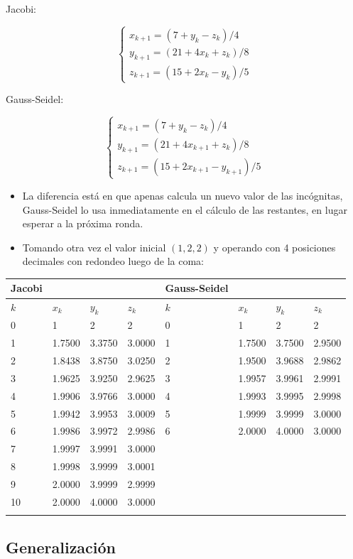 \documentclass[openany]{book}
\begin{document}
Jacobi:

\[
\begin{cases} 
x_{k+1}=(7+y_k-z_k)/4 \\
y_{k+1}=(21+4x_k+z_k)/8 \\
z_{k+1}=(15+2x_k-y_k)/5
\end{cases}
\]

Gauss-Seidel:

\[
\begin{cases} 
x_{k+1}=(7+y_k-z_k)/4 \\
y_{k+1}=(21+4x_{k+1}+z_k)/8 \\
z_{k+1}=(15+2x_{k+1}-y_{k+1})/5
\end{cases}
\]

\begin{itemize}
\item
  La diferencia está en que apenas calcula un nuevo valor de las incógnitas, Gauss-Seidel lo usa inmediatamente en el cálculo de las restantes, en lugar esperar a la próxima ronda.
\item
  Tomando otra vez el valor inicial \((1, 2, 2)\) y operando con 4 posiciones decimales con redondeo luego de la coma:
\end{itemize}

\begin{longtable}[]{@{}llllllll@{}}
\toprule
\textbf{Jacobi} & & & & \textbf{Gauss-Seidel} & & &\tabularnewline
\midrule
\endhead
\(k\) & \(x_k\) & \(y_k\) & \(z_k\) & \(k\) & \(x_k\) & \(y_k\) & \(z_k\)\tabularnewline
0 & 1 & 2 & 2 & 0 & 1 & 2 & 2\tabularnewline
1 & 1.7500 & 3.3750 & 3.0000 & 1 & 1.7500 & 3.7500 & 2.9500\tabularnewline
2 & 1.8438 & 3.8750 & 3.0250 & 2 & 1.9500 & 3.9688 & 2.9862\tabularnewline
3 & 1.9625 & 3.9250 & 2.9625 & 3 & 1.9957 & 3.9961 & 2.9991\tabularnewline
4 & 1.9906 & 3.9766 & 3.0000 & 4 & 1.9993 & 3.9995 & 2.9998\tabularnewline
5 & 1.9942 & 3.9953 & 3.0009 & 5 & 1.9999 & 3.9999 & 3.0000\tabularnewline
6 & 1.9986 & 3.9972 & 2.9986 & 6 & 2.0000 & 4.0000 & 3.0000\tabularnewline
7 & 1.9997 & 3.9991 & 3.0000 & & & &\tabularnewline
8 & 1.9998 & 3.9999 & 3.0001 & & & &\tabularnewline
9 & 2.0000 & 3.9999 & 2.9999 & & & &\tabularnewline
10 & 2.0000 & 4.0000 & 3.0000 & & & &\tabularnewline
& & & & & & &\tabularnewline
\bottomrule
\end{longtable}

\hypertarget{generalizaciuxf3n}{%
\subsection{Generalización}\label{generalizaciuxf3n}}
\end{document}
